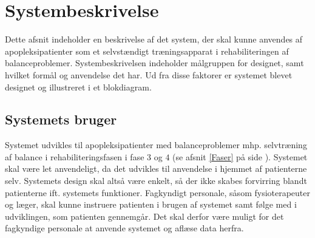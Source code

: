 \section{Systembeskrivelse} 
Dette afsnit indeholder en beskrivelse af det system, der skal kunne anvendes af apopleksipatienter som et selvstændigt træningsapparat i rehabiliteringen af balanceproblemer. Systembeskrivelsen indeholder målgruppen for designet, samt hvilket formål og anvendelse det har. Ud fra disse faktorer er systemet blevet designet og illustreret i et blokdiagram. 

\subsection{Systemets bruger}
Systemet udvikles til apopleksipatienter med balanceproblemer mhp. selvtræning af balance i rehabiliteringsfasen i fase $3$ og $4$ (se afsnit \ref{Faser} på side \pageref{Faser}). Systemet skal være let anvendeligt, da det udvikles til anvendelse i hjemmet af patienterne selv. Systemets design skal altså være enkelt, så der ikke skabes forvirring blandt patienterne ift. systemets funktioner. Fagkyndigt personale, såsom fysioterapeuter og læger, skal kunne instruere patienten i brugen af systemet samt følge med i udviklingen, som patienten gennemgår. Det skal derfor være muligt for det fagkyndige personale at anvende systemet og aflæse data herfra. 

